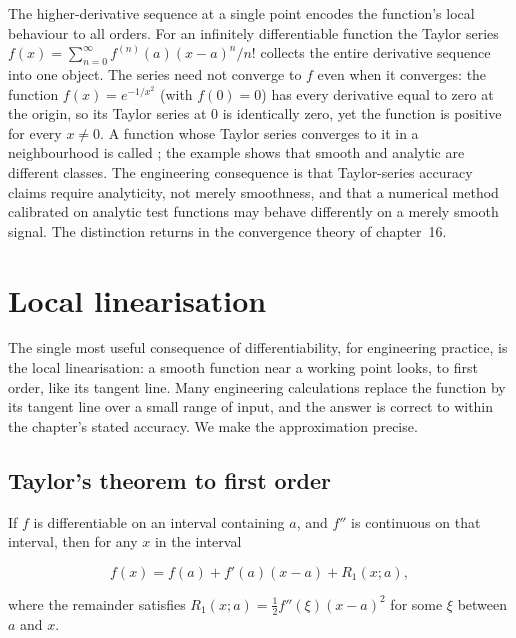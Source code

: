 \begin{mastery}
The higher-derivative sequence at a single point encodes the
function's local behaviour to all orders. For an infinitely
differentiable function the Taylor series
$f(x) = \sum_{n=0}^{\infty} f^{(n)}(a) (x - a)^{n} / n!$ collects
the entire derivative sequence into one object. The series need not
converge to $f$ even when it converges: the function
$f(x) = e^{-1/x^{2}}$ (with $f(0) = 0$) has every derivative equal
to zero at the origin, so its Taylor series at $0$ is identically
zero, yet the function is positive for every $x \neq 0$. A
function whose Taylor series converges to it in a neighbourhood is
called ; the example shows that smooth and
analytic are different classes. The engineering consequence is that
Taylor-series accuracy claims require analyticity, not merely
smoothness, and that a numerical method calibrated on analytic test
functions may behave differently on a merely smooth signal. The
distinction returns in the convergence theory of chapter~16.
\end{mastery}

\section{Local linearisation}

The single most useful consequence of differentiability, for
engineering practice, is the local linearisation: a smooth
function near a working point looks, to first order, like its
tangent line. Many engineering calculations replace the function
by its tangent line over a small range of input, and the answer
is correct to within the chapter's stated accuracy. We make the
approximation precise.

\subsection{Taylor's theorem to first order}

\begin{theorem}
If $f$ is differentiable on an interval containing $a$, and $f''$
is continuous on that interval, then for any $x$ in the interval

\[
f(x) = f(a) + f'(a)(x - a) + R_{1}(x; a),
\]

where the remainder satisfies $R_{1}(x; a) = \tfrac{1}{2}
f''(\xi) (x - a)^{2}$ for some $\xi$ between $a$ and $x$.
\end{theorem}

